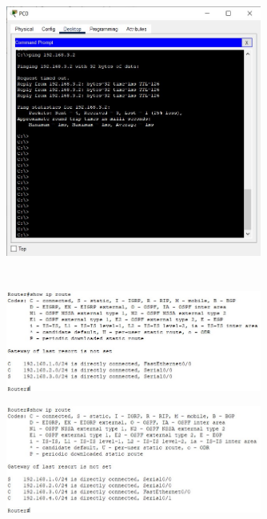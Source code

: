 \documentclass{article}
\begin{document}
\section{}%
\begin{figure}[H]
    \centering
    \includegraphics[width=0.75\textwidth]{figures/17.jpg}
    \caption{}
    \label{fig:fig1}
\end{figure}

\section{}%
\begin{figure}[H]
    \centering
    \includegraphics[width=0.75\textwidth]{figures/18.jpg}
    \caption{}
    \label{fig:fig1}
\end{figure}
\begin{figure}[H]
    \centering
    \includegraphics[width=0.75\textwidth]{figures/19.jpg}
    \caption{}
    \label{fig:fig1}
\end{figure}
\end{document}
